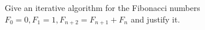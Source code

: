 Give an iterative algorithm for the Fibonacci numbers $F_0=0,F_1=1,F_{n+2}=F_{n+1}+F_n$ and justify it.
